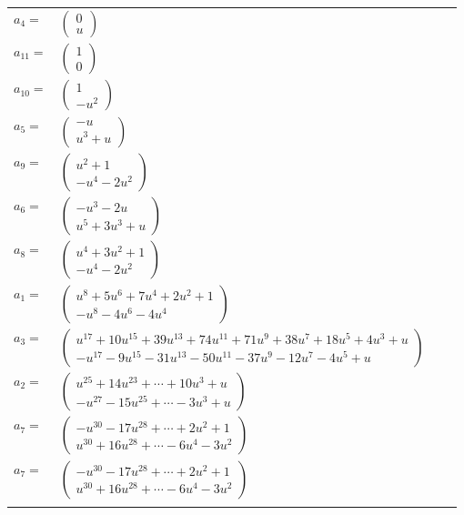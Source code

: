 \documentclass[1p]{elsarticle_modified}
\theoremstyle{definition}
\begin{document}
\begin{tabular}{m{7pt} m{180pt} m{7pt} m{180pt} }
\flushright $a_{4}=$&$\begin{pmatrix}0\\u\end{pmatrix}$ \\
\flushright $a_{11}=$&$\begin{pmatrix}1\\0\end{pmatrix}$ \\
\flushright $a_{10}=$&$\begin{pmatrix}1\\- u^2\end{pmatrix}$ \\
\flushright $a_{5}=$&$\begin{pmatrix}- u\\u^3+u\end{pmatrix}$ \\
\flushright $a_{9}=$&$\begin{pmatrix}u^2+1\\- u^4-2 u^2\end{pmatrix}$ \\
\flushright $a_{6}=$&$\begin{pmatrix}- u^3-2 u\\u^5+3 u^3+u\end{pmatrix}$ \\
\flushright $a_{8}=$&$\begin{pmatrix}u^4+3 u^2+1\\- u^4-2 u^2\end{pmatrix}$ \\
\flushright $a_{1}=$&$\begin{pmatrix}u^8+5 u^6+7 u^4+2 u^2+1\\- u^8-4 u^6-4 u^4\end{pmatrix}$ \\
\flushright $a_{3}=$&$\begin{pmatrix}u^{17}+10 u^{15}+39 u^{13}+74 u^{11}+71 u^9+38 u^7+18 u^5+4 u^3+u\\- u^{17}-9 u^{15}-31 u^{13}-50 u^{11}-37 u^9-12 u^7-4 u^5+u\end{pmatrix}$ \\
\flushright $a_{2}=$&$\begin{pmatrix}u^{25}+14 u^{23}+\cdots+10 u^3+u\\- u^{27}-15 u^{25}+\cdots-3 u^3+u\end{pmatrix}$ \\
\flushright $a_{7}=$&$\begin{pmatrix}- u^{30}-17 u^{28}+\cdots+2 u^2+1\\u^{30}+16 u^{28}+\cdots-6 u^4-3 u^2\end{pmatrix}$\\ \flushright $a_{7}=$&$\begin{pmatrix}- u^{30}-17 u^{28}+\cdots+2 u^2+1\\u^{30}+16 u^{28}+\cdots-6 u^4-3 u^2\end{pmatrix}$\\&\end{tabular}
\end{document}
